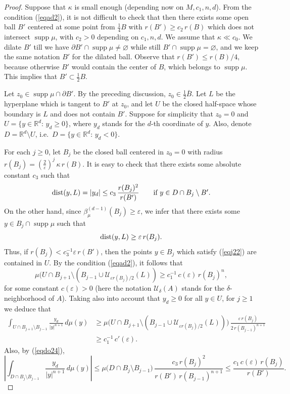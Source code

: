 \documentclass[11pt]{amsart}
\newcommand{\R}{{\mathbb R}}       %
\newcommand{\UU}{{\mathcal U}}
\newcommand{\RR}{{\mathcal R}}
\newcommand{\dist}{{\rm dist}}
\newcommand{\rf}[1]{{(\ref{#1})}}
\newcommand{\supp}{\operatorname{supp}}
\newcommand{\ve}{{\varepsilon}}
\theoremstyle{definition}
\theoremstyle{remark}
\numberwithin{equation}{section}
\begin{document}
\begin{proof}
Suppose that $\kappa$ is small enough (depending now on $M,c_1,n,d$). From the condition \rf{eqad2}, it is not difficult to check that
then there exists some open ball 
$B'$ centered at  some point from $\frac14B$ with $r(B')\geq c_2\,r(B)$
which does not intersect $\supp\mu$, with $c_2>0$ depending on $c_1,n,d$. We assume that $\kappa\ll c_0$. We dilate $B'$ till we have $\partial B'\cap\supp\mu\neq\varnothing$ while still $B'\cap\supp\mu=\varnothing$, and we keep the same notation $B'$ for the dilated ball. Observe that $r(B')\leq r(B)/4$, because 
otherwise $B'$ would contain the center of $B$, which belongs to $\supp\mu$. This implies that
$B'\subset \frac12 B$.

Let $z_0\in\supp\mu\cap \partial B'$. By the preceding discussion, $z_0\in\frac12 \bar B$.
Let $L$ be the hyperplane which is tangent to $B'$ at $z_0$, and let $U$ be the closed half-space
whose boundary is $L$ and does not contain $B'$. 
Suppose for simplicity that $z_0=0$ and $U=\{y\in\R^d:\,y_d\geq 0\}$, where $y_d$ stands for the $d$-th coordinate of $y$.
Also,  denote $D=\R^d\setminus U$, i.e.\ $D=\{y\in\R^d:\,y_d< 0\}$.

For each $j\geq 0$, let $B_j$ be the closed ball centered in  $z_0=0$ with radius $r(B_j)=\left(\frac{2}\ve\right)^j
\,\kappa\,r(B)$. It is easy to check that there exists some absolute constant $c_3$ such that
\begin{equation}\label{eqdo24}
\dist(y,L)= |y_d|\leq c_3\,\frac{r(B_j)^2}{r(B')}\qquad
\mbox{if $y\in D\cap B_j\setminus B'$.}
\end{equation}
On the other hand, since $\beta_\mu^{(d-1)}(B_j)\geq\ve$, we infer that
there exists some $y\in B_j\cap\supp\mu$ such that
\begin{equation}\label{eqj22}
\dist(y,L)\geq \ve\,r(B_j).
\end{equation}
Thus, if 
$r(B_j) < c_3^{-1}\ve\,r(B')$,
then the points $y\in B_j$ which satisfy \rf{eqj22} are contained in $U$. 
By the condition \rf{eqad2}, it follows that
$$\mu(U\cap B_{j+1}\setminus (B_{j-1}\cup \UU_{\ve r(B_j)/2}(L)) \geq c_1^{-1}\,c(\ve)\,r(B_j)^n,$$
for some constant $c(\ve)>0$ (here the notation $\UU_\delta(A)$ stands for the $\delta$-neighborhood of $A$).
Taking also into account that $y_d\geq0$ for all $y\in U$, for $j\geq 1$ we deduce that
\begin{align}\label{eqdo98}\nonumber
\int_{U\cap B_{j+1}\setminus B_{j-1}} \frac{y_d}{|y|^{n+1}}\,d\mu(y) &\geq 
\mu\bigl(
U\cap B_{j+1}\setminus (B_{j-1}\cup \UU_{\ve r(B_j)/2}(L))\bigr) \,
\frac{\ve \,r(B_j)}{2\,r(B_{j-1})^{n+1}}\\
& \geq c_1^{-1}\,c'(\ve).
\end{align}
Also, by \rf{eqdo24},
\begin{equation}\label{eqdo99}
\left|\int_{D\cap B_j\setminus B_{j-1}} \frac{y_d}{|y|^{n+1}}\,d\mu(y)\right| \leq 
\mu\bigl(
D\cap B_j\setminus B_{j-1}\bigr) \,
\frac{c_3\,r(B_j)^2}{r(B')\,r(B_{j-1})^{n+1}} \leq \frac{c_1\,c(\ve)\,r(B_j)}{r(B')}.
\end{equation}


\end{proof}
\end{document}
